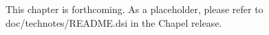\label{User_Defined_Domain_Maps}

\begin{craychapel}
This chapter is forthcoming.  As a placeholder, please refer to
doc/technotes/README.dsi in the Chapel release.
\end{craychapel}
